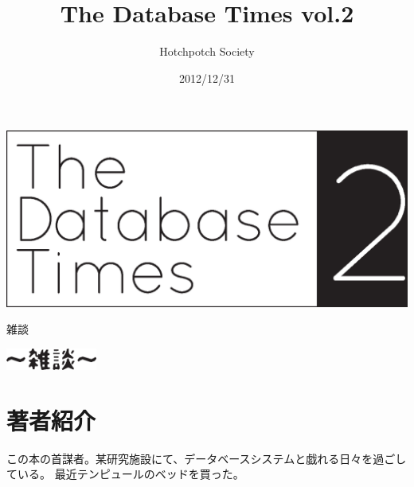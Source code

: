 \documentclass[b5paper,papersize,tombow,10pt]{jsbook}
\title{The Database Times vol.2}
\date{2012/12/31}
\author{Hotchpotch Society}
\begin{document}
\thispagestyle{empty}

\frontmatter

\vspace*{50mm}
\noindent\includegraphics[width=\textwidth]{images/title2.eps}



\setcounter{tocdepth}{0} %
\tableofcontents

\mainmatter

\pagestyle{fancy}









\newpage

{\protect 雑談}

\begin{center}
 \includegraphics[width=3cm]{images/zatsudan.eps}
\end{center}



\newpage

\plainifnotempty

\section*{著者紹介}

 \quad
この本の首謀者。某研究施設にて、データベースシステムと戯れる日々を過ごしている。
最近テンピュールのベッドを買った。
\end{document}
